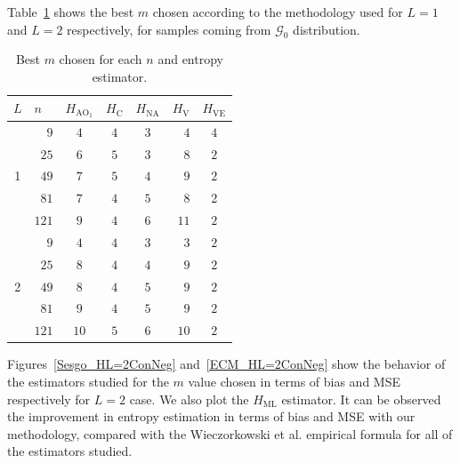 \documentclass[journal]{IEEEtran}
\begin{document}
Table~\ref{tab:Mejor_m} shows the best $m$ chosen according to the methodology used for $L=1$ and $L=2$ respectively, for samples coming from $\mathcal{G}_0$ distribution. 

\begin{table}[htbp]
	\label{tab:Mejor_m}
	\centering
	\caption{Best $m$ chosen for each $n$ and entropy estimator.}
	\begin{tabular}{crcccrc}
		\toprule
		$L$     & \multicolumn{1}{l}{$n$} & \multicolumn{1}{l}{$H_{{\text{AO}}_1}$} & \multicolumn{1}{l}{$H_\text{C}$} & \multicolumn{1}{l}{$H_{\text{NA}}$} & \multicolumn{1}{l}{$H_\text{V}$} & \multicolumn{1}{l}{$H_{\text{VE}}$} \\
		\midrule
		\multirow{5}[1]{*}{1} 
		& $9$     & $4$     & $4$     & $3$     & $4$     & $4$ \\
		& $25$    & $6$     & $5$     & $3$     & $8$     & $2$ \\
		& $49$    & $7$     & $5$     & $4$     & $9$     & $2$ \\
		& $81$    & $7$     & $4$     & $5$     & $8$     & $2$ \\
		& $121$   & $9$     & $4$     & $6$     & $11$    & $2$ \\
		\midrule
		\multirow{5}[0]{*}{2} 
		& $9$     & $4$     & $4$     & $3$     & $3$     & $2$ \\
		& $25$    & $8$     & $4$     & $4$     & $9$     & $2$ \\
		& $49$    & $8$     & $4$     & $5$     & $9$     & $2$ \\
		& $81$    & $9$     & $4$     & $5$     & $9$     & $2$ \\
		& $121$   & $10$    & $5$     & $6$     & $10$    & $2$ \\
		\bottomrule
	\end{tabular}
\end{table}


Figures~\ref{Sesgo_HL=2ConNeg} and~\ref{ECM_HL=2ConNeg} show the behavior of the estimators studied for the $m$ value chosen in terms of bias and MSE respectively for $L=2$ case. We also plot the $H_{\text{ML}}$ estimator. It can be observed the improvement in entropy estimation in terms of bias and MSE with our methodology, compared with the Wieczorkowski et al. empirical formula for all of the estimators studied.
\end{document}
